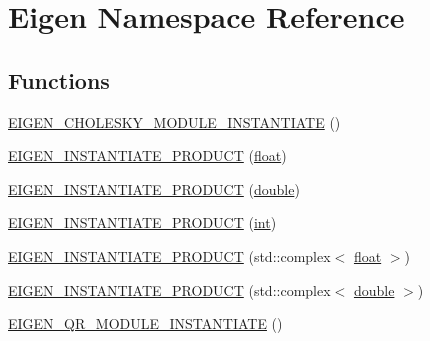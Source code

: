 \hypertarget{namespace_eigen}{\section{Eigen Namespace Reference}
\label{namespace_eigen}
}
\subsection*{Functions}
\begin{DoxyCompactItemize}
\item 
\hyperlink{namespace_eigen_a2f4addb19e53e53490a60031b440a5d6}{E\-I\-G\-E\-N\-\_\-\-C\-H\-O\-L\-E\-S\-K\-Y\-\_\-\-M\-O\-D\-U\-L\-E\-\_\-\-I\-N\-S\-T\-A\-N\-T\-I\-A\-T\-E} ()
\item 
\hyperlink{namespace_eigen_a3db1a3829afb49a29fdb872fbaa22d93}{E\-I\-G\-E\-N\-\_\-\-I\-N\-S\-T\-A\-N\-T\-I\-A\-T\-E\-\_\-\-P\-R\-O\-D\-U\-C\-T} (\hyperlink{_super_l_u_support_8h_a6a1bb6ed41f44b60e7bd83b0e9945aa7}{float})
\item 
\hyperlink{namespace_eigen_a52b6cf7185a2ab8ec44d88eacbaf3d9a}{E\-I\-G\-E\-N\-\_\-\-I\-N\-S\-T\-A\-N\-T\-I\-A\-T\-E\-\_\-\-P\-R\-O\-D\-U\-C\-T} (\hyperlink{_super_l_u_support_8h_a8956b2b9f49bf918deed98379d159ca7}{double})
\item 
\hyperlink{namespace_eigen_a2d3df6fa160c535a340e0c8ec819d5aa}{E\-I\-G\-E\-N\-\_\-\-I\-N\-S\-T\-A\-N\-T\-I\-A\-T\-E\-\_\-\-P\-R\-O\-D\-U\-C\-T} (\hyperlink{ioapi_8h_a787fa3cf048117ba7123753c1e74fcd6}{int})
\item 
\hyperlink{namespace_eigen_a7ed42ec8e64b7af80284a183c3fe4977}{E\-I\-G\-E\-N\-\_\-\-I\-N\-S\-T\-A\-N\-T\-I\-A\-T\-E\-\_\-\-P\-R\-O\-D\-U\-C\-T} (std\-::complex$<$ \hyperlink{_super_l_u_support_8h_a6a1bb6ed41f44b60e7bd83b0e9945aa7}{float} $>$)
\item 
\hyperlink{namespace_eigen_addb2dd3a96ae7769fe94f67fd9a2b499}{E\-I\-G\-E\-N\-\_\-\-I\-N\-S\-T\-A\-N\-T\-I\-A\-T\-E\-\_\-\-P\-R\-O\-D\-U\-C\-T} (std\-::complex$<$ \hyperlink{_super_l_u_support_8h_a8956b2b9f49bf918deed98379d159ca7}{double} $>$)
\item 
\hyperlink{namespace_eigen_a3fd54964740466243e15906b430a17b3}{E\-I\-G\-E\-N\-\_\-\-Q\-R\-\_\-\-M\-O\-D\-U\-L\-E\-\_\-\-I\-N\-S\-T\-A\-N\-T\-I\-A\-T\-E} ()
\end{DoxyCompactItemize}


